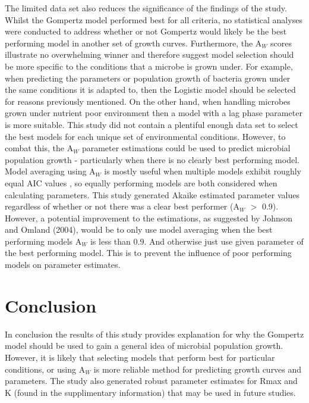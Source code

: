\documentclass[12pt]{article}
\begin{document}
The limited data set also reduces the significance of the findings of the study. Whilst the Gompertz model performed best for all criteria, no statistical analyses were conducted to address whether or not Gompertz would likely be the best performing model in another set of growth curves. Furthermore, the $\mathrm{A}_{\textit{W}}$ scores illustrate no overwhelming winner and therefore suggest model selection should be more specific to the conditions that a microbe is grown under. For example, when predicting the parameters or population growth of bacteria grown under the same conditions it is adapted to, then the Logistic model should be selected for reasons previously mentioned. On the other hand, when handling microbes grown under nutrient poor environment then a model with a lag phase parameter is more suitable. This study did not contain a plentiful enough data set to select the best models for each unique set of environmental conditions. However, to combat this, the $\mathrm{A}_{\textit{W}}$ parameter estimations could be used to predict microbial population growth - particularly when there is no clearly best performing model. Model averaging using $\mathrm{A}_{\textit{W}}$ is mostly useful when multiple models exhibit roughly equal AIC values \cite{JOHNSON2004101}, so equally performing models are both considered when calculating parameters. This study generated Akaike estimated parameter values regardless of whether or not there was a clear best performer ($\mathrm{A}_{\textit{W}}$ $>$ 0.9). However, a potential improvement to the estimations, as suggested by Johnson and Omland (2004), would be to only use model averaging when the best performing models $\mathrm{A}_{\textit{W}}$ is less than 0.9. And otherwise just use given parameter of the best performing model. This is to prevent the influence of poor performing models on parameter estimates.

\section{Conclusion}
In conclusion the results of this study provides explanation for why the Gompertz model should be used to gain a general idea of microbial population growth. However, it is likely that selecting models that perform best for particular conditions, or using $\mathrm{A}_{\textit{W}}$ is more reliable method for predicting growth curves and parameters. The study also generated robust parameter estimates for Rmax and K (found in the supplimentary information) that may be used in future studies.

  
  
  

  
\end{document}
